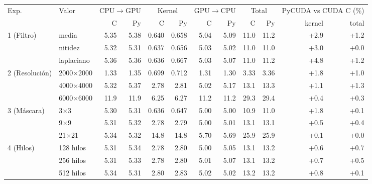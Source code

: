 \begin{tabular}{llrrrrrrrrrr}
\toprule
Exp. & Valor & \multicolumn{2}{c}{CPU$\to$GPU} & \multicolumn{2}{c}{Kernel} & \multicolumn{2}{c}{GPU$\to$CPU} & \multicolumn{2}{c}{Total} & \multicolumn{2}{c}{PyCUDA vs CUDA C (\%)} \\
 & & C & Py & C & Py & C & Py & C & Py & kernel & total \\
\midrule
1 (Filtro) & media & 5.35 & 5.38 & 0.640 & 0.658 & 5.04 & 5.09 & 11.0 & 11.2 & +2.9 & +1.2 \\
 & nitidez & 5.32 & 5.31 & 0.637 & 0.656 & 5.03 & 5.02 & 11.0 & 11.0 & +3.0 & +0.0 \\
 & laplaciano & 5.36 & 5.36 & 0.636 & 0.667 & 5.03 & 5.07 & 11.0 & 11.2 & +4.8 & +1.2 \\
\midrule
2 (Resolución) & 2000$\times$2000 & 1.33 & 1.35 & 0.699 & 0.712 & 1.31 & 1.30 & 3.33 & 3.36 & +1.8 & +1.0 \\
 & 4000$\times$4000 & 5.32 & 5.37 & 2.78 & 2.81 & 5.02 & 5.17 & 13.1 & 13.3 & +1.1 & +1.3 \\
 & 6000$\times$6000 & 11.9 & 11.9 & 6.25 & 6.27 & 11.2 & 11.2 & 29.3 & 29.4 & +0.4 & +0.3 \\
\midrule
3 (Máscara) & 3$\times$3 & 5.30 & 5.31 & 0.636 & 0.647 & 5.00 & 5.00 & 10.9 & 11.0 & +1.8 & +0.1 \\
 & 9$\times$9 & 5.31 & 5.32 & 2.78 & 2.79 & 5.00 & 5.01 & 13.1 & 13.1 & +0.5 & +0.4 \\
 & 21$\times$21 & 5.34 & 5.32 & 14.8 & 14.8 & 5.70 & 5.69 & 25.9 & 25.9 & +0.1 & +0.0 \\
\midrule
4 (Hilos) & 128 hilos & 5.31 & 5.34 & 2.78 & 2.80 & 5.00 & 5.05 & 13.1 & 13.2 & +0.6 & +0.7 \\
 & 256 hilos & 5.31 & 5.33 & 2.78 & 2.80 & 5.01 & 5.07 & 13.1 & 13.2 & +0.7 & +0.5 \\
 & 512 hilos & 5.34 & 5.31 & 2.80 & 2.83 & 5.02 & 5.02 & 13.2 & 13.2 & +0.8 & +0.1 \\
\bottomrule
\end{tabular}
